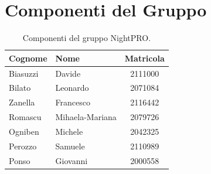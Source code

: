 \documentclass[a4paper, 11pt, oneside]{scrartcl}
\begin{document}
\newpage
\tableofcontents
\listoffigures
\listoftables
\pagestyle{fancy}

\newpage
\section*{Componenti del Gruppo}

\begin{table}[H]
    \centering
    \renewcommand{\arraystretch}{1.2}
    \begin{tabular}{@{}llc@{}}
        \toprule
        \textbf{Cognome} & \textbf{Nome}   & \textbf{Matricola} \\
        \midrule
        Biasuzzi         & Davide          & 2111000            \\
        Bilato           & Leonardo        & 2071084            \\
        Zanella          & Francesco       & 2116442            \\
        Romascu          & Mihaela-Mariana & 2079726            \\
        Ogniben          & Michele         & 2042325            \\
        Perozzo          & Samuele         & 2110989            \\
        Ponso            & Giovanni        & 2000558            \\
        \bottomrule
    \end{tabular}
    \caption{Componenti del gruppo NightPRO.}
\end{table}

\newpage


\newpage


\newpage


\newpage


\newpage


\newpage


\newpage

\end{document}
